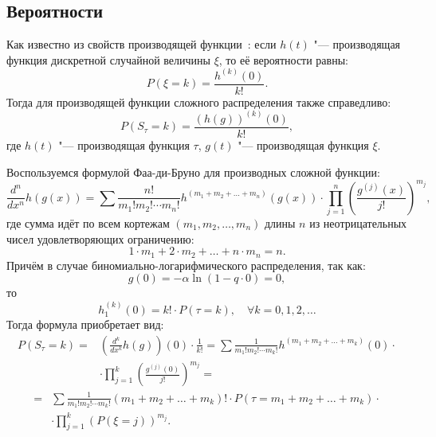 \documentclass[12pt, specialist, subf, substylefile = spbu_report.rtx]{disser}
\begin{document}
	\subsection{Вероятности}
	
	\label{sec:probBLR}
	
	Как известно из свойств производящей функции~\cite{bib:feller1952}: если $ h(t) $ "--- производящая функция дискретной случайной величины $ \xi $, то её вероятности равны:
	\[
		P(\xi = k) = \frac{h ^{(k)}(0)} {k!}.
	\]
	Тогда для производящей функции сложного распределения также справедливо:
	\[
		P(S _\tau = k) = \frac{\left(h(g) \right) ^{(k)}(0)} {k!}, 
	\]
	где $ h(t) $ "--- производящая функция $ \tau $, $ g(t) $ "--- производящая функция $ \xi $.
	
	Воспользуемся формулой Фаа-ди-Бруно для производных сложной функции:
	\[
		\frac {d ^n} {d x ^n} h(g(x)) = \sum \frac {n!} {m _1! m _2! \cdots m _n!} h ^{(m _1 + m _2 + \dots + m _n)} (g(x)) \cdot \prod \limits ^{n} _{j = 1} \left( \frac{g ^{(j)} (x)} {j!} \right) ^{m _j},
	\]
	где сумма идёт по всем кортежам $ (m _1, m _2, \dots, m _n) $ длины $ n $ из неотрицательных чисел удовлетворяющих ограничению:
	\[
		1 \cdot m _1 + 2 \cdot m _2 + \dots + n \cdot m _n = n.
	\]
	Причём в случае биномиально-логарифмического распределения, так как:
	\[ 
		g(0) = - \alpha \ln (1 - q \cdot 0) = 0, 
	\]
	то
	\[ 
		h _1 ^{(k)} (0) = k! \cdot P(\tau = k), \quad \forall k = 0, 1, 2, \dots
	\]
	Тогда формула приобретает вид:
	\[ 
		\begin{aligned}
			P(S _\tau = k) =& \left(\frac {d ^k} {d x ^k} 	h(g)\right)(0) \cdot \frac 1 {k!} = \sum \frac 1 {m _1! m _2! \cdots m _k!} h ^{(m _1 + m _2 + \dots + m _k)} (0) \cdot\\
			&\cdot \prod \limits ^{k} _{j = 1} \left( \frac{g ^{(j)} (0)} {j!} \right) ^{m _j} =
		\end{aligned}
	\]
	\[
		\begin{aligned}
			=& \sum \frac 1 {m _1! m _2! \cdots m _k!} (m _1 + m _2 + \dots + m _k)! \cdot P(\tau = m _1 + m _2 + \dots + m _k) \cdot\\
			&\cdot \prod \limits ^{k} _{j = 1} \left( P(\xi = j)  \right) ^{m _j}.
		\end{aligned}
	\]
	
\end{document}
